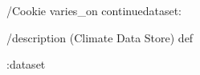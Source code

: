 \begin{ingrid}
/Cookie varies_on
continuedataset:


/description (Climate Data Store) def


:dataset
\end{ingrid}
